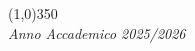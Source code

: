 \begin{titlepage}
\begin{center}
        \vfill %
        \begin{center}
            \line(1,0){350}\\
            \normalsize{\textit{Anno Accademico 2025/2026}}
        \end{center}
    \end{center}
\end{titlepage}